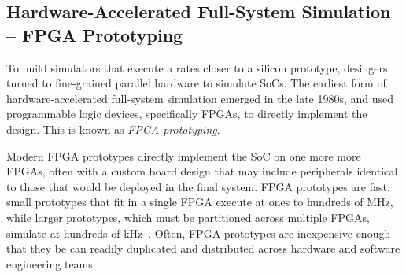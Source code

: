 \subsection{Hardware-Accelerated Full-System Simulation -- FPGA Prototyping}

To build simulators that execute a rates closer to a silicon prototype, desingers turned
to fine-grained parallel hardware to simulate SoCs.  The earliest form of
hardware-accelerated full-system simulation emerged in the late 1980s, and used
programmable logic devices, specifically FPGAs, to directly implement the
design. This is known as \textit{FPGA prototyping}.

Modern FPGA prototypes directly implement the SoC on one more
more FPGAs, often with a custom board design that may include peripherals
identical to those that would be deployed in the final system.  FPGA prototypes
are fast: small prototypes that fit in a single FPGA execute at ones to hundreds of
MHz, while larger prototypes, which must be partitioned across multiple FPGAs,
simulate at hundreds of kHz~\cite{nehalemprototype, atomprototype}.
Often, FPGA prototypes are inexpensive enough that they be can readily
duplicated and distributed across hardware and software engineering teams.

